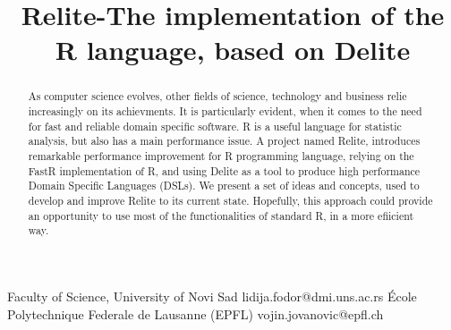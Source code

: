\documentclass{sigplanconf}
\begin{document}
\setlength{\pdfpageheight}{\paperheight}
\setlength{\pdfpagewidth}{\paperwidth}






\title{Relite-The implementation of the R language, based on Delite}

        {    Faculty of Science, University of Novi Sad} 
           {lidija.fodor@dmi.uns.ac.rs}
	    {École Polytechnique Federale de Lausanne (EPFL)}
           {vojin.jovanovic@epfl.ch}

\maketitle

\begin{abstract}
As computer science evolves, other fields of science, technology and business relie increasingly on its achievments. It is particularly evident,
when it comes to the need for fast and reliable domain specific software. R is a useful language for statistic analysis, but also has a 
main performance issue. A  project named Relite, introduces remarkable performance improvement for R programming language, relying on the FastR 
implementation of R, and using Delite as a tool to produce high performance Domain Specific Languages (DSLs). We present a set of ideas and concepts, 
used to develop and improve Relite to its current state. Hopefully, this approach could provide an opportunity to use most of the functionalities of 
standard R, in a more efiicient way.
\end{abstract}
\end{document}
